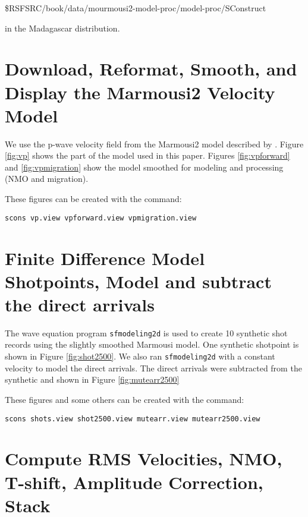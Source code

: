  \$RSFSRC/book/data/mourmousi2-model-proc/model-proc/SConstruct 

in the Madagascar distribution.

\section{Download, Reformat, Smooth, and Display the Marmousi2 Velocity Model}
We use the p-wave velocity field from the Marmousi2 model described by  
\cite{irons}.  Figure \ref{fig:vp} shows the part of the model used in this 
paper.  Figures \ref{fig:vpforward} and \ref{fig:vpmigration} show the model 
smoothed for modeling and processing (NMO and migration). 

These figures can be created with the command:
\begin{verbatim}
scons vp.view vpforward.view vpmigration.view
\end{verbatim}


\section{Finite Difference Model Shotpoints, Model and subtract the direct arrivals}

The wave equation program \texttt{sfmodeling2d} \cite[]{Yang} is used
to create 10 synthetic shot records using the slightly smoothed
Marmousi model.  One synthetic shotpoint is shown in
Figure \ref{fig:shot2500}. We also ran \texttt{sfmodeling2d} with a
constant velocity to model the direct arrivals.  The direct arrivals
were subtracted from the synthetic and shown in Figure
\ref{fig:mutearr2500} 

These figures and some others can be created with the command:
\begin{verbatim}
scons shots.view shot2500.view mutearr.view mutearr2500.view
\end{verbatim}


\section{Compute RMS Velocities, NMO, T-shift, Amplitude Correction, Stack}

